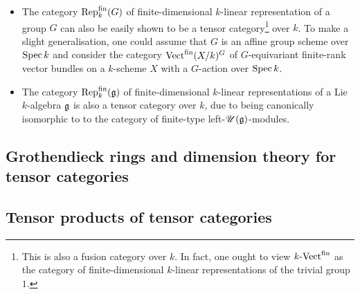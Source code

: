             \begin{example}
                \noindent
                \begin{itemize}
                    \item The category $\mathrm{Rep}_k^{\mathrm{fin}}(G)$ of finite-dimensional $k$-linear representation of a group $G$ can also be easily shown to be a tensor category\footnote{This is also a fusion category over $k$. In fact, one ought to view $k\text{-}\mathrm{Vect}^{\mathrm{fin}}$ as the category of finite-dimensional $k$-linear representations of the trivial group $1$.} over $k$. To make a slight generalisation, one could assume that $G$ is an affine group scheme over $\operatorname{Spec} k$ and consider the category $\mathrm{Vect}^{\mathrm{fin}}(X/k)^G$ of $G$-equivariant finite-rank vector bundles on a $k$-scheme $X$ with a $G$-action over $\operatorname{Spec} k$.
                    \item The category $\mathrm{Rep}_k^{\mathrm{fin}}(\mathfrak{g})$ of finite-dimensional $k$-linear representations of a Lie $k$-algebra $\mathfrak{g}$ is also a tensor category over $k$, due to being canonically isomorphic to to the category of finite-type left-$\mathscr{U}(\mathfrak{g})$-modules. 
                \end{itemize}
            \end{example}
            
            
    
    \subsection{Grothendieck rings and dimension theory for tensor categories}
    
    \subsection{Tensor products of tensor categories}